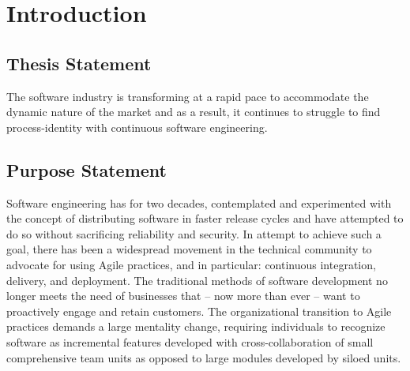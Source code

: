 \documentclass[11pt,a4paper]{article}
\begin{document}

\newpage

\section{Introduction}

\subsection{Thesis Statement}
The software industry is transforming at a rapid pace to accommodate the dynamic nature of the market and as a result, it continues to struggle to find process-identity with continuous software engineering.

\subsection{Purpose Statement}
Software engineering has for two decades, contemplated and experimented with the concept of distributing software in faster release cycles and have attempted to do so without sacrificing reliability and security. In attempt to achieve such a goal, there has been a widespread movement in the technical community to advocate for using Agile practices, and in particular: continuous integration, delivery, and deployment. The traditional methods of software development no longer meets the need of businesses that -- now more than ever -- want to proactively engage and retain customers. The organizational transition to Agile practices demands a large mentality change, requiring individuals to recognize software as incremental features developed with cross-collaboration of small comprehensive team units as opposed to large modules developed by siloed units.
\end{document}
